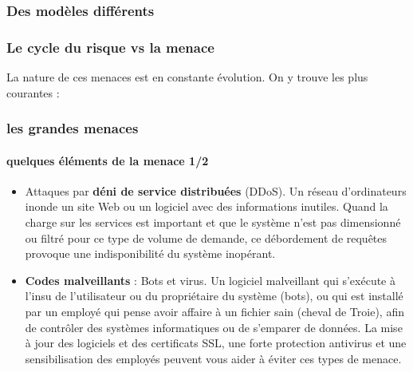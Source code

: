 \begin{frame}
\frametitle<presentation>{Des modèles différents}
\end{frame}

\begin{frame}
\frametitle<presentation>{Le cycle du risque vs la menace}
\end{frame}


La nature de ces menaces est en constante évolution.  On y trouve les plus courantes :

\begin{frame}
\frametitle<presentation>{les grandes menaces}
\framesubtitle<presentation>{quelques éléments de la menace 1/2}
\begin{itemize}

\item Attaques par \textbf{déni de service distribuées} (DDoS). Un réseau d’ordinateurs inonde un site Web ou un logiciel avec des informations inutiles. Quand la charge sur les services est important et que le système n'est pas dimensionné ou filtré pour ce type de volume de demande, ce débordement de requêtes provoque une indisponibilité du système inopérant. 

\item \textbf{Codes malveillants} : Bots et virus. Un logiciel malveillant qui s’exécute à l'insu de l'utilisateur ou du propriétaire du système (bots), ou qui est installé par un employé qui pense avoir affaire à un fichier sain (cheval de Troie), afin de contrôler des systèmes informatiques ou de s’emparer de données. La mise à jour des logiciels et des certificats SSL, une forte protection antivirus et une sensibilisation des employés peuvent vous aider à éviter ces types de menace.
\end{itemize}
\end{frame}

